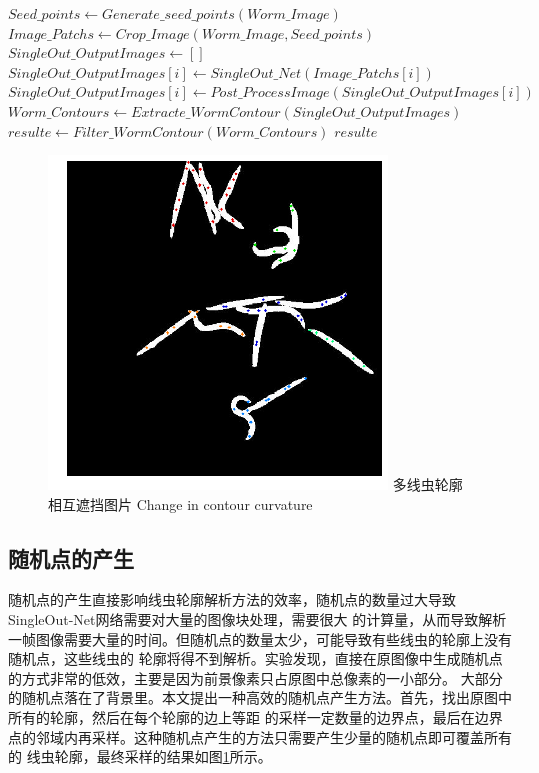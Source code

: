 \begin{algorithm}
\begin{algorithmic}[1]
		\State $Seed\_points \gets Generate\_seed\_points(Worm\_Image)$
		\State $Image\_Patchs \gets Crop\_Image(Worm\_Image,Seed\_points)$
		\State $SingleOut\_OutputImages \gets []$
			\State $SingleOut\_OutputImages[i] \gets SingleOut\_Net(Image\_Patchs[i])$
			\State $SingleOut\_OutputImages[i] \gets Post\_ProcessImage(SingleOut\_OutputImages[i])$
		\EndFor
		\State $Worm\_Contours \gets Extracte\_WormContour(SingleOut\_OutputImages)$
		\State $resulte \gets Filter\_WormContour(Worm\_Contours)$
		\State \Return $resulte$
\EndFunction
\end{algorithmic}
\end{algorithm}
		\begin{figure}[htp]
	  \centering
	  \includegraphics[width=9cm]{figure/chap4/rand_seed.png}
	  \bicaption
		{多线虫轮廓相互遮挡图片}
		{Change in contour curvature}
	  \label{fig:chap4:rand_seed}
	\end{figure}
\subsection{随机点的产生}
	随机点的产生直接影响线虫轮廓解析方法的效率，随机点的数量过大导致SingleOut-Net网络需要对大量的图像块处理，需要很大
	的计算量，从而导致解析一帧图像需要大量的时间。但随机点的数量太少，可能导致有些线虫的轮廓上没有随机点，这些线虫的
	轮廓将得不到解析。实验发现，直接在原图像中生成随机点的方式非常的低效，主要是因为前景像素只占原图中总像素的一小部分。
	大部分的随机点落在了背景里。本文提出一种高效的随机点产生方法。首先，找出原图中所有的轮廓，然后在每个轮廓的边上等距
	的采样一定数量的边界点，最后在边界点的邻域内再采样。这种随机点产生的方法只需要产生少量的随机点即可覆盖所有的
	线虫轮廓，最终采样的结果如图\ref{fig:chap4:rand_seed}所示。

